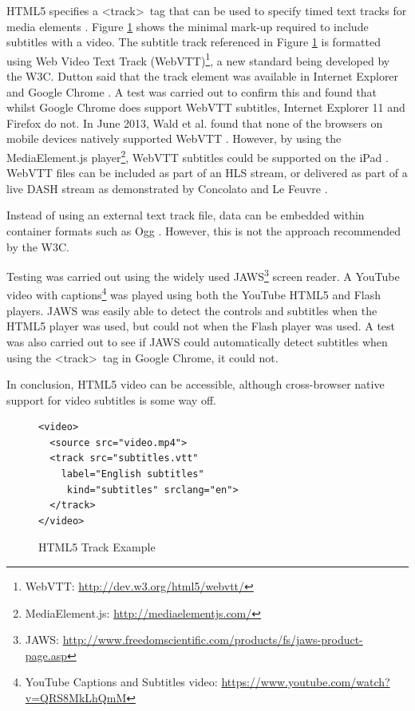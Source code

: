 \documentclass[journal]{IEEEtran}
\begin{document}
HTML5 specifies a \textless track\textgreater~tag that can be used to specify timed text tracks for media elements \cite{standard:html5}. Figure \ref{lst:trackExample} shows the minimal mark-up required to include subtitles with a video. The subtitle track referenced in Figure \ref{lst:trackExample} is formatted using Web Video Text Track (WebVTT)\footnote{WebVTT: \url{http://dev.w3.org/html5/webvtt/}}, a new standard being developed by the W3C. Dutton said that the track element was available in Internet Explorer and Google Chrome \cite{website:html5RocksTrackElement}. A test was carried out to confirm this and found that whilst Google Chrome does support WebVTT subtitles, Internet Explorer 11 and Firefox do not. In June 2013, Wald et al. found that none of the browsers on mobile devices natively supported WebVTT \cite{article:synote}. However, by using the MediaElement.js player\footnote{MediaElement.js: \url{http://mediaelementjs.com/}}, WebVTT subtitles could be supported on the iPad \cite{article:synote}. WebVTT files can be included as part of an HLS stream, or delivered as part of a live DASH stream as demonstrated by Concolato and Le Feuvre \cite{misc:HTTPLiveStreaming}\cite{inproceedings:liveHTTPSubtitle}.

Instead of using an external text track file, data can be embedded within container formats such as Ogg \cite{inproceedings:accessibilityForTheHTML5VideoElement}\cite{website:oggSubtitles}. However, this is not the approach recommended by the W3C. %

Testing was carried out using the widely used JAWS\footnote{JAWS: \url{http://www.freedomscientific.com/products/fs/jaws-product-page.asp}} screen reader. A YouTube video with captions\footnote{YouTube Captions and Subtitles video: \url{https://www.youtube.com/watch?v=QRS8MkLhQmM}} was played using both the YouTube HTML5 and Flash players. JAWS was easily able to detect the controls and subtitles when the HTML5 player was used, but could not when the Flash player was used. A test was also carried out to see if JAWS could automatically detect subtitles when using the \textless track\textgreater~tag in Google Chrome, it could not.

In conclusion, HTML5 video can be accessible, although cross-browser native support for video subtitles is some way off.

\begin{figure}
\caption{HTML5 Track Example \cite{website:html5RocksTrackElement}}
\begin{lstlisting}[frame=single,language=HTML5]
<video>
  <source src="video.mp4">
  <track src="subtitles.vtt"
    label="English subtitles"
     kind="subtitles" srclang="en">
  </track>
</video>
\end{lstlisting}
\label{lst:trackExample}
\end{figure}
\end{document}
